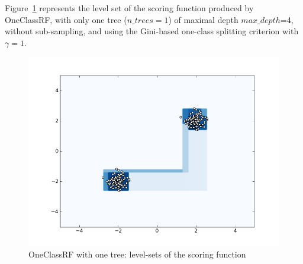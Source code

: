 Figure~\ref{ocrf:fig:oneclassrf} represents the level set of the scoring function produced by OneClassRF, with only one tree ($n\_trees$$=1$) of maximal depth $max\_depth$=4, without sub-sampling, and using the Gini-based one-class splitting criterion with $\gamma=1$.
\begin{figure}[ht]
  \centering
  \includegraphics[width=0.5\linewidth]{fig_source/ocrf_fig/oneclassrf.png}
  \caption{OneClassRF with one tree: level-sets of the scoring function}
  \label{ocrf:fig:oneclassrf}
\end{figure}




